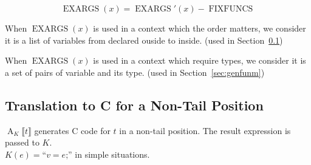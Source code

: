\documentclass[a4paper,fleqn]{article}
\DeclareMathOperator{\FIXFUNCS}{FIXFUNCS}
\DeclareMathOperator{\EXARGS}{EXARGS}
\newcommand{\BRA}[1]{\llbracket #1 \rrbracket}
\newcommand{\dq}[1]{\text{``}#1\text{''}}
\newcommand{\ttsemi}{\texttt{;}}
\newcommand{\secref}[1]{Section~\ref{#1}}
\DeclareMathOperator{\Aop}{A}
\newcommand{\A}[2]{\Aop_{#1}\BRA{#2}}
\begin{document}
\[
  \EXARGS(x) = \EXARGS'(x) - \FIXFUNCS
\]

When $\EXARGS(x)$ is used in a context which the order matters,
we consider it is a list of variables from declared ouside to inside.
(used in \secref{sec:AK})

When $\EXARGS(x)$ is used in a context which require types,
we consider it is a set of pairs of variable and its type.
(used in \secref{sec:genfunm})

\subsection{Translation to C for a Non-Tail Position}\label{sec:AK}
$\A{K}{t}$ generates C code for $t$ in a non-tail position.
The result expression is passed to $K$. \\
$K(e) = \dq{v = e\ttsemi}$ in simple situations.
\end{document}
